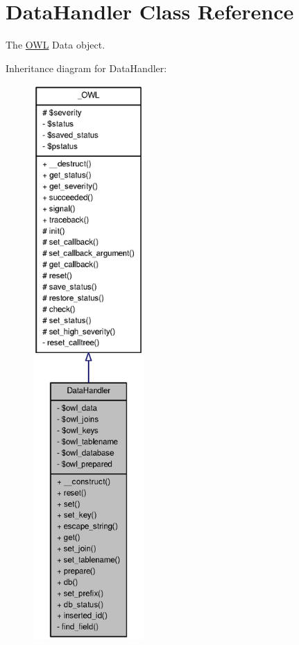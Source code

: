 \section{DataHandler Class Reference}
\label{classDataHandler}


The \hyperlink{classOWL}{OWL} Data object.  




Inheritance diagram for DataHandler:\nopagebreak
\begin{figure}[H]
\begin{center}
\leavevmode
\includegraphics[height=600pt]{classDataHandler__inherit__graph}
\end{center}
\end{figure}


